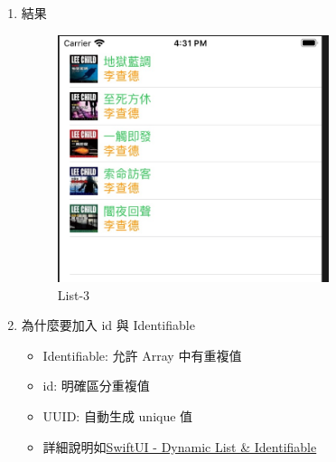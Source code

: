 \documentclass[a4paper,12pt]{article}
\begin{document}
\begin{enumerate}
\item 結果
\label{sec:orgd0d4a2c}
\begin{figure}[htbp]
\centering
\includegraphics[width=300]{images/list-3.jpg}
\caption{\label{fig:list-3}List-3}
\end{figure}
\item 為什麼要加入 id 與 Identifiable
\label{sec:org7179784}
\begin{itemize}
\item Identifiable: 允許 Array 中有重複值\\
\item id: 明確區分重複值\\
\item UUID: 自動生成 unique 值\\
\item 詳細說明如\href{https://medium.com/flawless-app-stories/swiftui-dynamic-list-identifiable-73c56215f9ff}{SwiftUI - Dynamic List \& Identifiable}\\
\end{itemize}
\end{enumerate}
\end{document}
